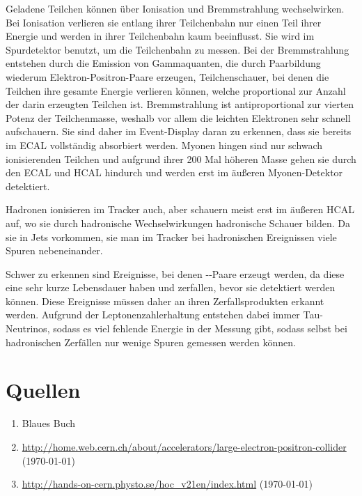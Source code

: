 \documentclass[a4paper,ngerman]{scrartcl}
\begin{document}
Geladene Teilchen können über Ionisation und Bremmstrahlung wechselwirken. 
Bei Ionisation verlieren sie entlang ihrer Teilchenbahn nur einen Teil ihrer Energie und werden in ihrer Teilchenbahn kaum beeinflusst.
Sie wird im Spurdetektor benutzt, um die Teilchenbahn zu messen.
Bei der Bremmstrahlung entstehen durch die Emission von Gammaquanten, die durch Paarbildung wiederum Elektron-Positron-Paare erzeugen,
Teilchenschauer, bei denen die Teilchen ihre gesamte Energie verlieren können, welche proportional zur Anzahl der darin erzeugten Teilchen ist.
Bremmstrahlung ist antiproportional zur vierten Potenz der Teilchenmasse, weshalb vor allem die leichten Elektronen sehr schnell aufschauern. 
Sie sind daher im Event-Display daran zu erkennen, dass sie bereits im ECAL vollständig absorbiert werden. 
Myonen hingen sind nur schwach ionisierenden Teilchen und aufgrund ihrer 200 Mal höheren Masse gehen sie durch den ECAL und HCAL hindurch und werden erst im äußeren Myonen-Detektor detektiert.


Hadronen ionisieren im Tracker auch, aber schauern meist erst im äußeren HCAL auf, wo sie durch hadronische Wechselwirkungen hadronische Schauer bilden. Da sie in Jets vorkommen, sie man im Tracker bei hadronischen Ereignissen viele Spuren nebeneinander.

Schwer zu erkennen sind Ereignisse, bei denen \Ptauon-\APtauon-Paare erzeugt werden, da diese eine sehr kurze Lebensdauer haben und zerfallen,
bevor sie detektiert werden können. Diese Ereignisse müssen daher an ihren Zerfallsprodukten erkannt werden.
Aufgrund der Leptonenzahlerhaltung entstehen dabei immer Tau-Neutrinos, sodass es viel fehlende Energie in der Messung gibt, sodass selbst bei hadronischen Zerfällen nur wenige Spuren gemessen werden können.



\section{Quellen}
\begin{enumerate}
\item Blaues Buch \label{ref:BB}
\item \url{http://home.web.cern.ch/about/accelerators/large-electron-positron-collider}
 (\today) \label{ref:cernlep}
\item \url{http://hands-on-cern.physto.se/hoc_v21en/index.html} (\today)\label{ref:hands-on}
\end{enumerate}
\end{document}
